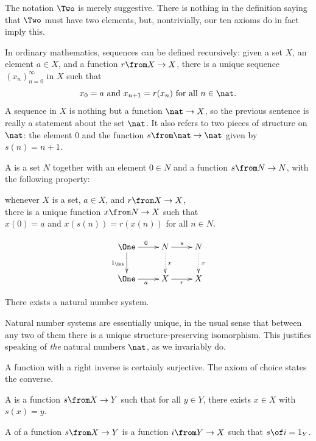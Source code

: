 \documentclass[12pt]{article}
\begin{document}
The notation $\Two$ is merely suggestive.  There is nothing in the
definition saying that $\Two$ must have two elements, but, nontrivially,
our ten axioms do in fact imply this.


% 
In ordinary mathematics, sequences can be defined recursively: given a set
$X$, an element $a \in X$, and a function $r \from X \to X$, there is a
unique sequence $(x_n)_{n = 0}^\infty$ in $X$ such that
\[
x_0 = a
\text{ and }
x_{n + 1} = r(x_n) 
\text{ for all } n \in \nat.
\]
A sequence in $X$ is nothing but a function $\nat \to X$, so the previous
sentence is really a statement about the set $\nat$.  It also refers to two
pieces of structure on $\nat$: the element $0$ and the function $s\from
\nat \to \nat$ given by $s(n) = n + 1$.

\begin{dfn}
A  is a set $N$ together with an
element $0 \in N$ and a function $s\from N \to N$, with the
following property:
% 
\begin{defnprop}
whenever $X$ is a set, $a \in X$, and $r\from X \to X$,\\
there is a unique function $x\from N \to X$ such that\\
$x(0) = a$
and 
$x(s(n)) = r(x(n))$ for all $n \in N$.
\end{defnprop}
\end{dfn}
\[
\xymatrix{
\One \ar[r]^0 \ar[d]_{1_{\One}} &N \ar[r]^s \ar@{.>}[d]^x
                                                &N \ar@{.>}[d]^x        \\
\One \ar[r]_a                   &X \ar[r]_r     &X
}
\]
% 
\begin{axiom}{9}
There exists a natural number system.
\end{axiom}

Natural number systems are essentially unique, in the usual sense that
between any two of them there is a unique structure-preserving isomorphism.
This justifies speaking of \emph{the} natural numbers $\nat$, as we
invariably do.


% 
A function with a right inverse is certainly surjective.  The axiom of
choice states the converse.

\begin{dfn}
A  is a function $s \from X \to Y$ such that for all $y
\in Y$, there exists $x \in X$ with $s(x) = y$.

A  of a function $s\from X \to Y$ is a function
$i\from Y \to X$ such that $s \of i = 1_Y$.
\end{dfn}
\end{document}
